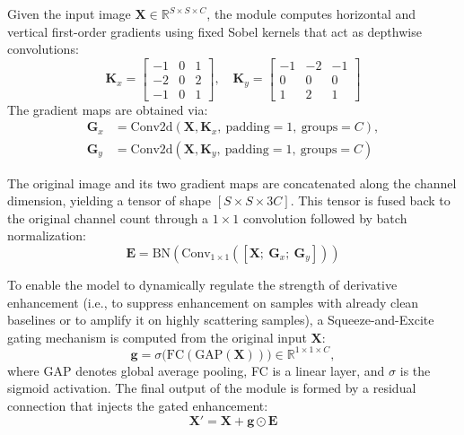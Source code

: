 \documentclass[pdflatex,sn-mathphys-num]{sn-jnl}%
\begin{document}
Given the input image $\textbf{X}\in \mathbb{R}^{S\times S\times C}$, the module computes horizontal and vertical first-order gradients using fixed Sobel kernels that act as depthwise convolutions:
\begin{equation}
    \mathbf{K}_x = 
        \begin{bmatrix}
        -1 & 0 & 1 \\
        -2 & 0 & 2 \\
        -1 & 0 & 1
        \end{bmatrix}, \quad
    \mathbf{K}_y = 
        \begin{bmatrix}
        -1 & -2 & -1 \\
         0 &  0 &  0 \\
         1 &  2 &  1
        \end{bmatrix}
\end{equation}
The gradient maps are obtained via:
\begin{equation}
    \begin{split}
    \mathbf{G}_x &= \text{Conv2d}(\mathbf{X}, \mathbf{K}_x,\ \text{padding}=1,\ \text{groups}=C), \\
    \mathbf{G}_y &= \text{Conv2d}(\mathbf{X}, \mathbf{K}_y,\ \text{padding}=1,\ \text{groups}=C)
    \end{split}
\end{equation}

The original image and its two gradient maps are concatenated along the channel dimension, yielding a tensor of shape $\left[S \times S \times 3C\right]$. This tensor is fused back to the original channel count through a $1\times 1$ convolution followed by batch normalization:
\begin{equation}
    \textbf{E} = \text{BN}\left(\text{Conv}_{1\times 1}\left(\left[\textbf{X};\ \textbf{G}_x;\ \textbf{G}_y \right]\right)\right)
\end{equation}

To enable the model to dynamically regulate the strength of derivative enhancement (i.e., to suppress enhancement on samples with already clean baselines or to amplify it on highly scattering samples), a Squeeze-and-Excite gating mechanism is computed from the original input $\textbf{X}$:
\begin{equation}
    \mathbf{g} = \sigma\bigl(\text{FC}(\text{GAP}(\mathbf{X}))\bigr) \in \mathbb{R}^{1 \times 1 \times C},
\end{equation}
where GAP denotes global average pooling, FC is a linear layer, and $\sigma$ is the sigmoid activation. The final output of the module is formed by a residual connection that injects the gated enhancement:
\begin{equation}
    \mathbf{X}' = \mathbf{X} + \mathbf{g} \odot \mathbf{E}
\end{equation}
\end{document}
